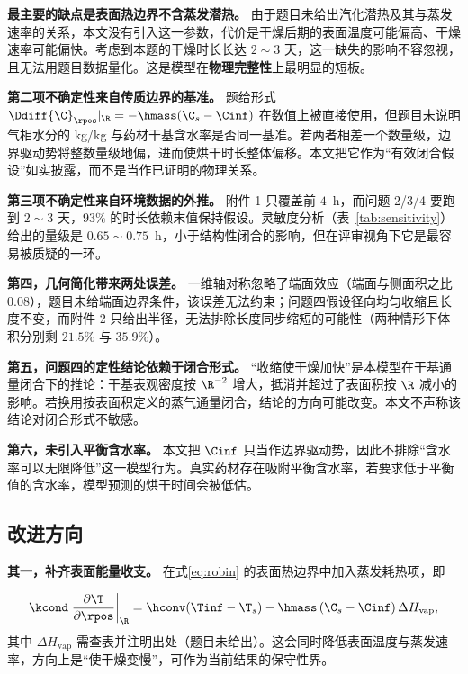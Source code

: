 \textbf{最主要的缺点是表面热边界不含蒸发潜热。} 由于题目未给出汽化潜热及其与蒸发速率的关系，本文没有引入这一参数，代价是干燥后期的表面温度可能偏高、干燥速率可能偏快。考虑到本题的干燥时长长达 $2\sim3$ 天，这一缺失的影响不容忽视，且无法用题目数据量化。这是模型在\textbf{物理完整性}上最明显的短板。

\textbf{第二项不确定性来自传质边界的基准。} 题给形式 $\Ddiff{\C}_\rpos|_\R=-\hmass({\C}_s-\Cinf)$ 在数值上被直接使用，但题目未说明气相水分的 kg/kg 与药材干基含水率是否同一基准。若两者相差一个数量级，边界驱动势将整数量级地偏，进而使烘干时长整体偏移。本文把它作为``有效闭合假设''如实披露，而不是当作已证明的物理关系。

\textbf{第三项不确定性来自环境数据的外推。} 附件 1 只覆盖前 $4$~h，而问题 2/3/4 要跑到 $2\sim3$ 天，$93\%$ 的时长依赖末值保持假设。灵敏度分析（表~\ref{tab:sensitivity}）给出的量级是 $0.65\sim0.75$~h，小于结构性闭合的影响，但在评审视角下它是最容易被质疑的一环。

\textbf{第四，几何简化带来两处误差。} 一维轴对称忽略了端面效应（端面与侧面积之比 $0.08$），题目未给端面边界条件，该误差无法约束；问题四假设径向均匀收缩且长度不变，而附件 2 只给出半径，无法排除长度同步缩短的可能性（两种情形下体积分别剩 $21.5\%$ 与 $35.9\%$）。

\textbf{第五，问题四的定性结论依赖于闭合形式。} ``收缩使干燥加快''是本模型在干基通量闭合下的推论：干基表观密度按 ${\R}^{-2}$ 增大，抵消并超过了表面积按 $\R$ 减小的影响。若换用按表面积定义的蒸气通量闭合，结论的方向可能改变。本文不声称该结论对闭合形式不敏感。

\textbf{第六，未引入平衡含水率。} 本文把 $\Cinf$ 只当作边界驱动势，因此不排除``含水率可以无限降低''这一模型行为。真实药材存在吸附平衡含水率，若要求低于平衡值的含水率，模型预测的烘干时间会被低估。

\subsection{改进方向}

\textbf{其一，补齐表面能量收支。} 在式\eqref{eq:robin} 的表面热边界中加入蒸发耗热项，即

\begin{equation}
\kcond\left.\frac{\partial \T}{\partial \rpos}\right|_{\R}=\hconv(\Tinf-{\T}_s)-\hmass\,({\C}_s-\Cinf)\,\Delta H_{\mathrm{vap}},
\end{equation}
其中 $\Delta H_{\mathrm{vap}}$ 需查表并注明出处（题目未给出）。这会同时降低表面温度与蒸发速率，方向上是``使干燥变慢''，可作为当前结果的保守性界。


